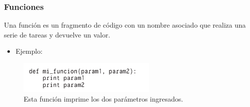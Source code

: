\begin{frame}[fragile]
  \frametitle{Funciones}

  Una funci\'on es un fragmento de c\'odigo con un nombre asociado que
  realiza una serie de tareas y devuelve un valor.

  \begin{itemize}
  \item{Ejemplo:}
  \end{itemize}
  
  \begin{figure}
    \includegraphics[width=0.6\textwidth]{Imagenes/Ejm.jpg}
    \caption{\label{fig:Ejm}Esta funci\'on imprime los dos par\'ametros ingresados.}
  \end{figure}

\end{frame}
